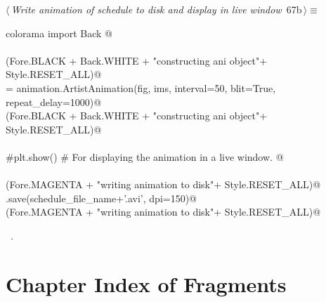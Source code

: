 \documentclass[11.5pt]{report}
\begin{document}
\vspace{-0.8cm} \newchunk


\begin{flushleft} \small\label{scrap97}\raggedright\small
{} $\langle\,${\itshape Write animation of schedule to disk and display in live window}\nobreak\ {\footnotesize {67b}}$\,\rangle\equiv$
\vspace{-1ex}
\begin{list}{}{} \item
\mbox{}\verb@from colorama import Back @\\
\mbox{}\verb@@\\
\mbox{}\verb@debug(Fore.BLACK + Back.WHITE + "\nStarted constructing ani object"+ Style.RESET_ALL)@\\
\mbox{}\verb@ani = animation.ArtistAnimation(fig, ims, interval=50, blit=True, repeat_delay=1000)@\\
\mbox{}\verb@debug(Fore.BLACK + Back.WHITE + "\nFinished constructing ani object"+ Style.RESET_ALL)@\\
\mbox{}\verb@@\\
\mbox{}\verb@#plt.show() # For displaying the animation in a live window. @\\
\mbox{}\verb@@\\
\mbox{}\verb@debug(Fore.MAGENTA + "\nStarted writing animation to disk"+ Style.RESET_ALL)@\\
\mbox{}\verb@ani.save(schedule_file_name+'.avi', dpi=150)@\\
\mbox{}\verb@debug(Fore.MAGENTA + "\nFinished writing animation to disk"+ Style.RESET_ALL)@\\
\mbox{}\verb@@{\NWsep}
\end{list}
\vspace{-1.5ex}
\footnotesize
\begin{list}{}{\setlength{\itemsep}{-\parsep}\setlength{\itemindent}{-\leftmargin}}
\item \NWtxtMacroRefIn\ .

\item{}
\end{list}
\vspace{4ex}
\end{flushleft}

\section{Chapter Index of Fragments}
\end{document}
